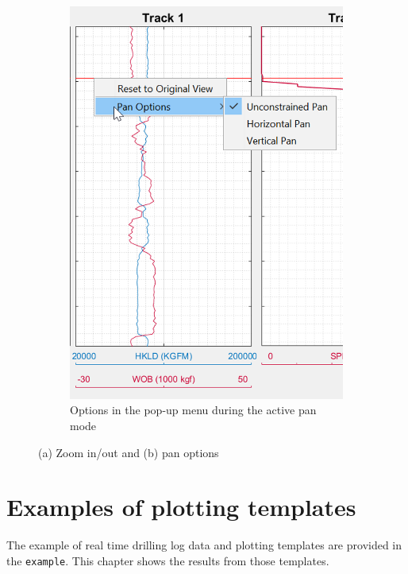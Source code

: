 \documentclass[12pt,a4paper,oneside]{report}
\begin{document}
\begin{figure}[ht]
\begin{subfigure}[b]{0.45\textwidth}
    \includegraphics[width=\textwidth]{fig/pan.png}
    \caption{Options in the pop-up menu during the active pan mode}
  \end{subfigure}
\caption{(a) Zoom in/out and (b) pan options}
\end{figure}

\chapter{Examples of plotting templates}
The example of real time drilling log data and plotting templates are provided in the \texttt{example}. This chapter shows the results from those templates.
\end{document}
